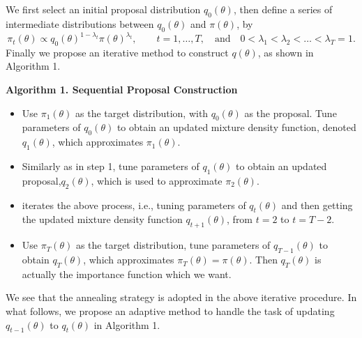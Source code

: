 We first select an initial proposal distribution $q_0(\theta)$, then
define a series of intermediate distributions between $q_0(\theta)$
and $\pi(\theta)$, by
\begin{equation}
\pi_t(\theta)\propto
q_0(\theta)^{1-\lambda_t}\pi(\theta)^{\lambda_t}, \quad\quad
t=1,\ldots,T, \quad \mbox{and}\quad
0<\lambda_1<\lambda_2<\dots<\lambda_T=1.
\end{equation}
Finally we propose an iterative method to construct $q(\theta)$, as
shown in Algorithm 1.
\begin{center}
\textbf{Algorithm 1. Sequential Proposal Construction}
\end{center}
\begin{itemize}
\item Use $\pi_1(\theta)$ as the target distribution, with $q_0(\theta)$
as the proposal. Tune parameters of $q_0(\theta)$ to obtain an
updated mixture density function, denoted $q_1(\theta)$, which
approximates $\pi_1(\theta)$.
\item Similarly as in step 1, tune parameters of $q_1(\theta)$ to
obtain an updated proposal,$q_2(\theta)$, which is used to
approximate $\pi_2(\theta)$.
\item iterates the above process, i.e., tuning parameters of $q_t(\theta)$ and then getting the updated mixture density function $q_{t+1}(\theta)$, from $t=2$ to $t=T-2$.
\item Use $\pi_T(\theta)$ as the target distribution, tune parameters of
$q_{T-1}(\theta)$ to obtain $q_{T}(\theta)$, which approximates
$\pi_T(\theta)=\pi(\theta)$. Then $q_{T}(\theta)$ is actually the
importance function which we want.
\end{itemize}

We see that the annealing strategy is adopted in the above iterative
procedure. In what follows, we propose an adaptive method to handle
the task of updating $q_{t-1}(\theta)$ to $q_{t}(\theta)$ in
Algorithm 1.

